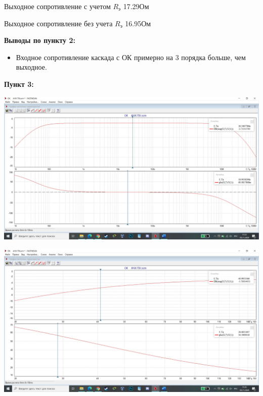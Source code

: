 \documentclass[a4paper,14pt]{extarticle}
\begin{document}
    Выходное сопротивление с учетом $R_{\text{э}}$ 17.29Ом

    Выходное сопротивление без учета $R_{\text{э}}$ 16.95Ом

    \textbf{Выводы по пункту 2:}
    \vspace{-6ex}
    \begin{singlespace}
        \begin{itemize}
            \item Входное сопротивление каскада с ОК примерно на 3 порядка больше, чем выходное.
        \end{itemize}
    \end{singlespace}

    \newpage 
    \textbf{Пункт 3:}
    \begin{center}
        \includegraphics[scale=0.25]{3.1.jpg}
    \end{center}
    \begin{center}
        \includegraphics[scale=0.25]{3.2.jpg}
    \end{center}
\end{document}

